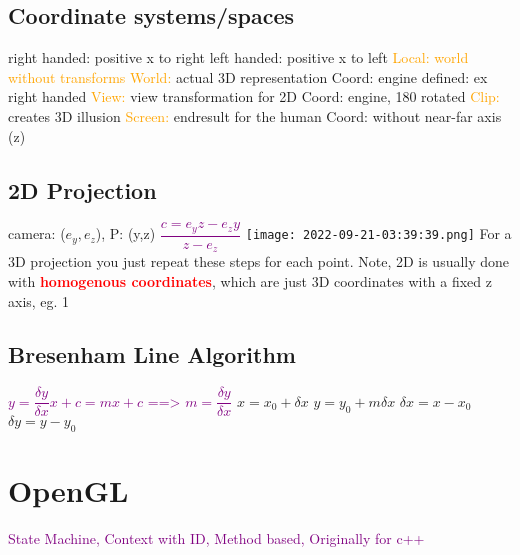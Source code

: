 \documentclass[main.tex,fontsize=12pt,paper=a4,paper=landscape,DIV=calc,]{scrartcl}
\begin{document}
\begin{multicols*}{4}
\subsection{Coordinate systems/spaces}
right handed: positive x to right\newline
left handed: positive x to left\newline
\textcolor{orange}{Local: world without transforms}\newline
\textcolor{orange}{World:} actual 3D representation \newline
Coord: engine defined: ex right handed\newline 
\textcolor{orange}{View:} view transformation for 2D \newline
Coord: engine, 180 rotated\newline
\textcolor{orange}{Clip:} creates 3D illusion\newline
\textcolor{orange}{Screen:} endresult for the human\newline
Coord: without near-far axis (z)

\subsection{2D Projection}
camera: (\(e_y, e_z\)), P: (y,z)\newline
\textcolor{purple}{\(\dfrac{c = e_y z - e_z y}{z - e_z}\)}
\texttt{[image: 2022-09-21-03:39:39.png]}\newline
For a 3D projection you just repeat these steps for each point.\newline
Note, 2D is usually done with \textcolor{red}{\textbf{homogenous coordinates}}, which are just 3D coordinates with a fixed z axis, eg. 1

\subsection{Bresenham Line Algorithm}
\textcolor{purple}{\(y = \dfrac{\delta y}{\delta x}x + c = mx + c\) ==> \(m = \dfrac{\delta y}{\delta x}\)}\newline
\(x = x_0 + \delta x\) \(y = y_0 + m\delta x\) \newline \(\delta x = x - x_0\) \(\delta y = y - y_0 \)

\section{OpenGL}
 \textcolor{purple}{State Machine, Context with ID, \newline Method based, Originally for c++}


\end{multicols*}
\end{document}

